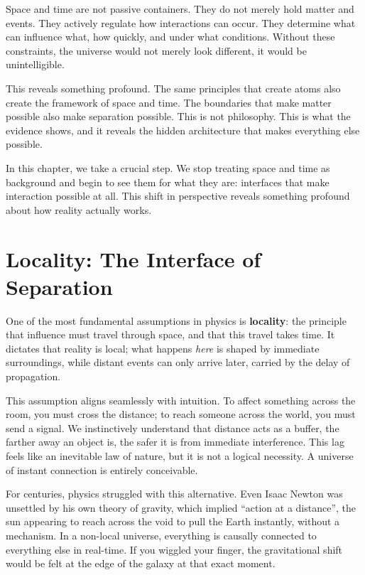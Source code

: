\documentclass[
  openright]{book}
\begin{document}
Space and time are not passive containers. They do not merely hold
matter and events. They actively regulate how interactions can occur.
They determine what can influence what, how quickly, and under what
conditions. Without these constraints, the universe would not merely
look different, it would be unintelligible.

This reveals something profound. The same principles that create atoms
also create the framework of space and time. The boundaries that make
matter possible also make separation possible. This is not philosophy.
This is what the evidence shows, and it reveals the hidden architecture
that makes everything else possible.

In this chapter, we take a crucial step. We stop treating
space and time as background and begin to see
them for what they are: interfaces that make
interaction possible at all. This shift in perspective reveals something
profound about how reality actually works.

\section{Locality: The Interface of
Separation}\label{locality-the-interface-of-separation}

One of the most fundamental assumptions in physics is
\textbf{locality}: the principle that influence must
travel through space, and that this travel takes time. It dictates that
reality is local; what happens \emph{here} is shaped by immediate
surroundings, while distant events can only arrive later, carried by the
delay of propagation.

This assumption aligns seamlessly with intuition. To affect something
across the room, you must cross the distance; to reach someone across
the world, you must send a signal. We instinctively understand that
distance acts as a buffer, the farther away an object is, the safer it
is from immediate interference. This lag feels like an inevitable law of
nature, but it is not a logical necessity. A universe of instant
connection is entirely conceivable.

For centuries, physics struggled with this alternative. Even Isaac
Newton was unsettled by his own theory of gravity, which implied
``action at a distance'', the sun appearing to reach across the void to
pull the Earth instantly, without a mechanism. In a non-local universe,
everything is causally connected to everything else in real-time. If you
wiggled your finger, the gravitational shift would be felt at the edge
of the galaxy at that exact moment.
\end{document}
